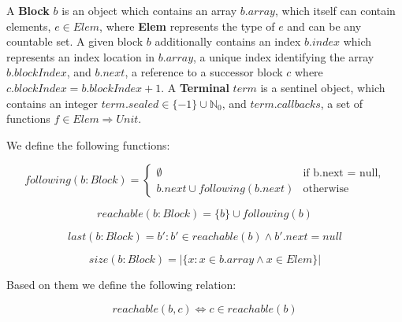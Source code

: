 \documentclass[runningheads,a4paper]{llncs}
\begin{document}
\begin{definition}
A \textbf{Block} $b$ is an object which
contains an array $b.array$, which itself can contain elements, $e \in Elem$,
where \textbf{Elem} represents the type of $e$ and can be any countable set. A
given block $b$ additionally contains an index $b.index$ which represents an
index location in $b.array$, a unique index identifying the array
$b.blockIndex$, and $b.next$, a reference to a successor block $c$ where
$c.blockIndex = b.blockIndex + 1$. A \textbf{Terminal} $term$ is a sentinel
object, which contains an integer $term.sealed \in \{-1\} \cup \mathbb{N}_0$, and
$term.callbacks$, a set of functions $f \in Elem \Rightarrow Unit$.

We define the following functions:

\begin{equation*}
following(b: Block) = 
\begin{cases}
\emptyset & \text{if b.next = null,}
\\
b.next \cup following(b.next) & \text{otherwise}
\end{cases}
\end{equation*}

\begin{equation*}
reachable(b: Block) = \{ b \} \cup following(b)
\end{equation*}

\begin{equation*}
last(b: Block) = b' : b' \in reachable(b) \wedge b'.next = null
\end{equation*}

\begin{equation*}
size(b: Block) = | \{ x : x \in b.array \wedge x \in Elem \} |
\end{equation*}

Based on them we define the following relation:

\begin{equation*}
reachable(b, c) \Leftrightarrow c \in reachable(b)
\end{equation*}
\end{definition}
\end{document}
